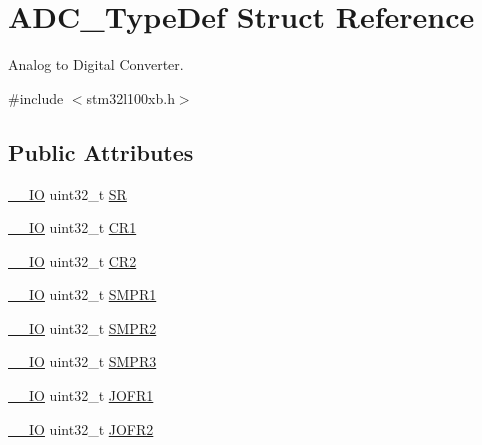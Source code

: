 \hypertarget{struct_a_d_c___type_def}{\section{A\-D\-C\-\_\-\-Type\-Def Struct Reference}
\label{struct_a_d_c___type_def}
}


Analog to Digital Converter.  




{\ttfamily \#include $<$stm32l100xb.\-h$>$}

\subsection*{Public Attributes}
\begin{DoxyCompactItemize}
\item 
\hyperlink{core__sc300_8h_aec43007d9998a0a0e01faede4133d6be}{\-\_\-\-\_\-\-I\-O} uint32\-\_\-t \hyperlink{struct_a_d_c___type_def_a9745df96e98f3cdc2d05ccefce681f64}{S\-R}
\item 
\hyperlink{core__sc300_8h_aec43007d9998a0a0e01faede4133d6be}{\-\_\-\-\_\-\-I\-O} uint32\-\_\-t \hyperlink{struct_a_d_c___type_def_a89b1ff4376683dd2896ea8b32ded05b2}{C\-R1}
\item 
\hyperlink{core__sc300_8h_aec43007d9998a0a0e01faede4133d6be}{\-\_\-\-\_\-\-I\-O} uint32\-\_\-t \hyperlink{struct_a_d_c___type_def_a1053a65a21af0d27afe1bf9cf7b7aca7}{C\-R2}
\item 
\hyperlink{core__sc300_8h_aec43007d9998a0a0e01faede4133d6be}{\-\_\-\-\_\-\-I\-O} uint32\-\_\-t \hyperlink{struct_a_d_c___type_def_a73009a8122fcc628f467a4e997109347}{S\-M\-P\-R1}
\item 
\hyperlink{core__sc300_8h_aec43007d9998a0a0e01faede4133d6be}{\-\_\-\-\_\-\-I\-O} uint32\-\_\-t \hyperlink{struct_a_d_c___type_def_a9e68fe36c4c8fbbac294b5496ccf7130}{S\-M\-P\-R2}
\item 
\hyperlink{core__sc300_8h_aec43007d9998a0a0e01faede4133d6be}{\-\_\-\-\_\-\-I\-O} uint32\-\_\-t \hyperlink{struct_a_d_c___type_def_abd2c17178853fe4ec3491bab206042d8}{S\-M\-P\-R3}
\item 
\hyperlink{core__sc300_8h_aec43007d9998a0a0e01faede4133d6be}{\-\_\-\-\_\-\-I\-O} uint32\-\_\-t \hyperlink{struct_a_d_c___type_def_aa005e656f528aaad28d70d61c9db9b81}{J\-O\-F\-R1}
\item 
\hyperlink{core__sc300_8h_aec43007d9998a0a0e01faede4133d6be}{\-\_\-\-\_\-\-I\-O} uint32\-\_\-t \hyperlink{struct_a_d_c___type_def_aa20f76044c11042dde41c1060853fb82}{J\-O\-F\-R2}

\end{DoxyCompactItemize}
